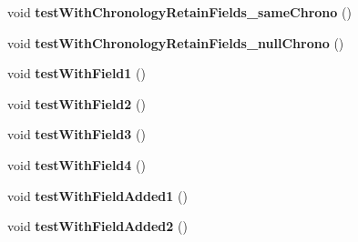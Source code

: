 \begin{DoxyCompactItemize}
\item 
\hypertarget{classorg_1_1joda_1_1time_1_1_test_time_of_day___basics_ac30fb2370a63af157a18cbf813f825f5}{void {\bfseries test\-With\-Chronology\-Retain\-Fields\-\_\-same\-Chrono} ()}\label{classorg_1_1joda_1_1time_1_1_test_time_of_day___basics_ac30fb2370a63af157a18cbf813f825f5}

\item 
\hypertarget{classorg_1_1joda_1_1time_1_1_test_time_of_day___basics_a30a5c979fb326045f79e7ae4802d318c}{void {\bfseries test\-With\-Chronology\-Retain\-Fields\-\_\-null\-Chrono} ()}\label{classorg_1_1joda_1_1time_1_1_test_time_of_day___basics_a30a5c979fb326045f79e7ae4802d318c}

\item 
\hypertarget{classorg_1_1joda_1_1time_1_1_test_time_of_day___basics_a251ffdb620ad712dac25468e36b07483}{void {\bfseries test\-With\-Field1} ()}\label{classorg_1_1joda_1_1time_1_1_test_time_of_day___basics_a251ffdb620ad712dac25468e36b07483}

\item 
\hypertarget{classorg_1_1joda_1_1time_1_1_test_time_of_day___basics_a2bd8132d87c8329635d487785089cdeb}{void {\bfseries test\-With\-Field2} ()}\label{classorg_1_1joda_1_1time_1_1_test_time_of_day___basics_a2bd8132d87c8329635d487785089cdeb}

\item 
\hypertarget{classorg_1_1joda_1_1time_1_1_test_time_of_day___basics_a2b58a241459a3d1b05bb13c427f5d702}{void {\bfseries test\-With\-Field3} ()}\label{classorg_1_1joda_1_1time_1_1_test_time_of_day___basics_a2b58a241459a3d1b05bb13c427f5d702}

\item 
\hypertarget{classorg_1_1joda_1_1time_1_1_test_time_of_day___basics_a34ef7123b339648818c81e7a95d914f9}{void {\bfseries test\-With\-Field4} ()}\label{classorg_1_1joda_1_1time_1_1_test_time_of_day___basics_a34ef7123b339648818c81e7a95d914f9}

\item 
\hypertarget{classorg_1_1joda_1_1time_1_1_test_time_of_day___basics_ac5cc77bceb1f5085b27c3e97a32e7b56}{void {\bfseries test\-With\-Field\-Added1} ()}\label{classorg_1_1joda_1_1time_1_1_test_time_of_day___basics_ac5cc77bceb1f5085b27c3e97a32e7b56}

\item 
\hypertarget{classorg_1_1joda_1_1time_1_1_test_time_of_day___basics_aea1785f6d9a787dfc3ebe767d42893e8}{void {\bfseries test\-With\-Field\-Added2} ()}\label{classorg_1_1joda_1_1time_1_1_test_time_of_day___basics_aea1785f6d9a787dfc3ebe767d42893e8}


\end{DoxyCompactItemize}
